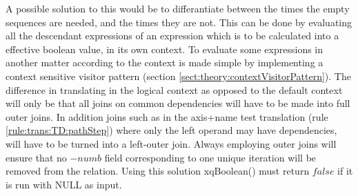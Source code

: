 A possible solution to this would be to differantiate between the times the empty sequences are needed, and the
times they are not. This can be done by evaluating all the descendant
expressions of an expression which is to be calculated into a effective boolean value, in its own context. To evaluate some expressions in another matter
according to the context is made simple by implementing a context sensitive visitor pattern (section
\ref{sect:theory:contextVisitorPattern}). The difference in translating in the logical context as opposed to the
default context will only be that all joins on common dependencies will have to be made into full outer joins. In
addition joins such as in the axis+name test translation (rule \ref{rule:trans:TD:pathStep}) where only the left
operand may have dependencies, will have to be turned into a left-outer join. Always employing outer joins will
ensure that no $-numb$ field corresponding to one unique iteration will be removed from the relation. Using this
solution \textsf{xqBoolean()} must return $false$ if it is run with \textsf{NULL} as input.